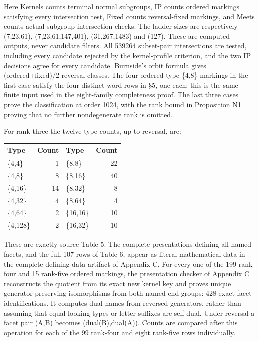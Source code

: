 \documentclass[
  11pt,
  a4paper,
]{article}
\newcounter{none} %
\begin{document}
Here Kernels counts terminal normal subgroups, IP counts ordered
markings satisfying every intersection test, Fixed counts reversal-fixed
markings, and Meets counts actual subgroup-intersection checks. The
ladder sizes are respectively (7,23,61), (7,23,61,147,401),
(31,267,1483) and (127). These are computed outputs, never candidate
filters. All 539264 subset-pair intersections are tested, including
every candidate rejected by the kernel-profile criterion, and the two IP
decisions agree for every candidate. Burnside's orbit formula gives
(ordered+fixed)/2 reversal classes. The four ordered type-\{4,8\}
markings in the first case satisfy the four distinct word rows in §5,
one each; this is the same finite input used in the eight-family
completeness proof. The last three cases prove the classification at
order 1024, with the rank bound in Proposition N1 proving that no
further nondegenerate rank is omitted.

For rank three the twelve type counts, up to reversal, are:

{\def\LTcaptype{none} %
\begin{longtable}[]{@{}lrlr@{}}
\toprule\noalign{}
Type & Count & Type & Count \\
\midrule\noalign{}
\endhead
\bottomrule\noalign{}
\endlastfoot
\{4,4\} & 1 & \{8,8\} & 22 \\
\{4,8\} & 8 & \{8,16\} & 40 \\
\{4,16\} & 14 & \{8,32\} & 8 \\
\{4,32\} & 4 & \{8,64\} & 4 \\
\{4,64\} & 2 & \{16,16\} & 10 \\
\{4,128\} & 2 & \{16,32\} & 10 \\
\end{longtable}
}

These are exactly source Table 5. The complete presentations defining
all named facets, and the full 107 rows of Table 6, appear as literal
mathematical data in the complete defining-data artifact of Appendix C.
For every one of the 199 rank-four and 15 rank-five ordered markings,
the presentation checker of Appendix C reconstructs the quotient from
its exact new kernel key and proves unique generator-preserving
isomorphisms from both named end groups: 428 exact facet
identifications. It computes dual names from reversed generators, rather
than assuming that equal-looking types or letter suffixes are self-dual.
Under reversal a facet pair (A,B) becomes (dual(B),dual(A)). Counts are
compared after this operation for each of the 99 rank-four and eight
rank-five rows individually.
\end{document}
